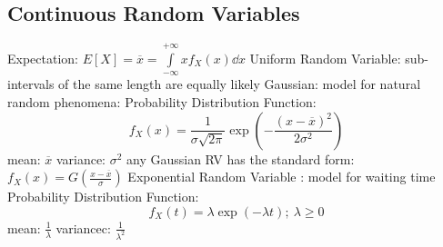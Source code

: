 \documentclass[a4paper,11pt]{article}
\begin{document}
	\subsection{Continuous Random Variables}
	\begin{outline}[enumerate]
		\1 Expectation: $E\left[X\right] = \overline{x} = \int\limits_{-\infty}^{+\infty} xf_{X}\left(x\right) \dd x$
		\1 Uniform Random Variable: sub-intervals of the same length are equally likely
		\1 Gaussian: model for natural random phenomena:
			\2 Probability Distribution Function: 
			\begin{equation}
				f_{X}(x) = \frac{1}{\sigma\sqrt{2\pi}}\exp\left(-\frac{\left(x - \overline{x}\right)^{2}}{2\sigma^2}\right)
			\end{equation} 
			\2 mean: $\overline{x}$
			\2 variance: $\sigma^{2}$
		\1 any Gaussian RV has the standard form: $f_{X}(x) = G\left(\frac{x - \overline{x}}{\sigma}\right)$
		\1 Exponential Random Variable : model for waiting time
		 	\2 Probability Distribution Function: 
		 	\begin{equation}
		 		f_{X}(t) = \lambda\exp\left(-\lambda t\right);~\lambda \geq 0
		 	\end{equation}
		 	\2 mean: $\frac{1}{\lambda}$
		 	\2 variancec: $\frac{1}{\lambda^{2}}$	
	\end{outline}
\end{document}
